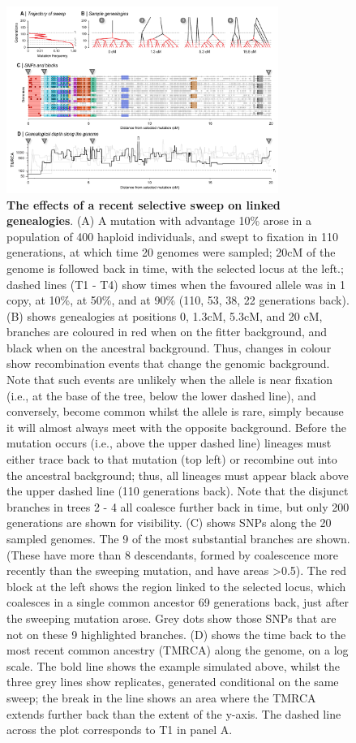 \documentclass[twocolumn]{bmcart}%
\begin{document}
\begin{figure}
    \includegraphics[width=0.79\textwidth]{Fig_4.pdf}
    \caption{\footnotesize{\textbf{The effects of a recent selective sweep on linked genealogies}. (A) A mutation with advantage 10\% arose in a population of 400 haploid individuals, and swept to fixation in 110 generations, at which time 20 genomes were sampled; 20cM of the genome is followed back in time, with the selected locus at the left.; dashed lines (T1 - T4) show times when the favoured allele was in 1 copy, at 10\%, at 50\%, and at 90\% (110, 53, 38, 22 generations back). (B) shows genealogies at positions 0, 1.3cM, 5.3cM, and 20 cM, branches are coloured in red when on the fitter background, and black when on the ancestral background. Thus, changes in colour show recombination events that change the genomic background. Note that such events are unlikely when the allele is near fixation (i.e., at the base of the tree, below the lower dashed line), and conversely, become common whilst the allele is rare, simply because it will almost always meet with the opposite background. Before the mutation occurs (i.e., above the upper dashed line) lineages must either trace back to that mutation (top left) or recombine out into the ancestral background; thus, all lineages must appear black above the upper dashed line (110 generations back). Note that the disjunct branches in trees 2 - 4 all coalesce further back in time, but only 200 generations are shown for visibility. (C) shows SNPs along the 20 sampled genomes. The 9 of the most substantial branches are shown. (These have more than 8 descendants, formed by coalescence more recently than the sweeping mutation, and have areas >0.5). The red block at the left shows the region linked to the selected locus, which coalesces in a single common ancestor 69 generations back, just after the sweeping mutation arose. Grey dots show those SNPs that are not on these 9 highlighted branches. (D) shows the time back to the most recent common ancestry (TMRCA) along the genome, on a log scale. The bold line shows the example simulated above, whilst the three grey lines show replicates, generated conditional on the same sweep; the break in the line shows an area where the TMRCA extends further back than the extent of the y-axis. The dashed line across the plot corresponds to T1 in panel A.} }
\end{figure}
\end{document}
